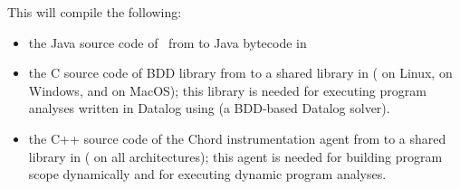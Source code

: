 \noindent This will compile the following:
\begin{itemize}
\item
the Java source code of \Chord\ from  to Java bytecode in 
\item
the C source code of BDD library  from 
to a shared library in  ( on Linux,  on Windows, and
 on MacOS);
this library is needed for executing program analyses written in Datalog using
 (a BDD-based Datalog solver).
\item
the C++ source code of the Chord instrumentation agent from  to a shared
library in  ( on all architectures);
this agent is needed for building program scope dynamically
and for executing dynamic program analyses.
\end{itemize}

